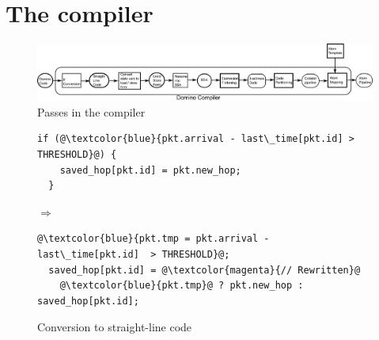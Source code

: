 \section{The \pktlanguage compiler}
\label{s:compiler}

\begin{figure}[!t]
  \includegraphics[width=\textwidth]{compiler.pdf}
  \caption{Passes in the \pktlanguage compiler}
  \label{fig:passes}
\end{figure}

\begin{figure}[!t]
  \hspace{-0.3in}
  \begin{minipage}{0.55\textwidth}
  \begin{small}
  \begin{lstlisting}[style=customc, numbers=none, frame=none]
  if (@\textcolor{blue}{pkt.arrival - last\_time[pkt.id] > THRESHOLD}@) {
    saved_hop[pkt.id] = pkt.new_hop;
  }
  \end{lstlisting}
  \end{small}
  \end{minipage}
%  
  \hspace{-0.5in}
  $\Longrightarrow$ 
  \hspace{-0.3in}
%  
  \begin{minipage}{0.6\textwidth}
  \begin{small}
  \begin{lstlisting}[style=customc, numbers=none, frame=none]
  @\textcolor{blue}{pkt.tmp = pkt.arrival - last\_time[pkt.id]  > THRESHOLD}@;
  saved_hop[pkt.id] = @\textcolor{magenta}{// Rewritten}@
    @\textcolor{blue}{pkt.tmp}@ ? pkt.new_hop : saved_hop[pkt.id];
  \end{lstlisting}
  \end{small}
  \end{minipage}
\vspace{-.2in}
\caption{Conversion to straight-line code}
\label{fig:if_convert}
\end{figure}

